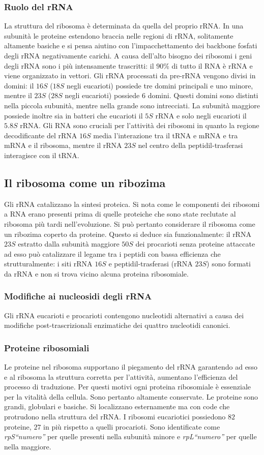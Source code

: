 \subsubsection{Ruolo del rRNA}
La struttura del ribosoma \`e determinata da quella del proprio rRNA. In una subunit\`a le proteine estendono braccia nelle regioni di rRNA, solitamente altamente basiche e si pensa aiutino con 
l'impacchettamento dei backbone fosfati degli rRNA negativamente carichi. A causa dell'alto bisogno dei ribosomi i geni degli rRNA sono i pi\`u intensamente trascritti: il $90\%$ di tutto il RNA \`e
rRNA e viene organizzato in vettori. Gli rRNA processati da pre-rRNA vengono divisi in domini: il $16S$ ($18S$ negli eucarioti) possiede tre domini principali e uno minore, mentre il $23S$ ($28S$ negli
eucarioti) possiede $6$ domini. Questi domini sono distinti nella piccola subunit\`a, mentre nella grande sono intrecciati. La subunit\`a maggiore possiede inoltre sia in batteri che eucarioti il 
$5S$ rRNA e solo negli eucarioti il $5.8S$ rRNA. Gli RNA sono cruciali per l'attivit\`a dei ribosomi in quanto la regione decodificante del rRNA $16S$ media l'interazione tra il tRNA e mRNA e tra
mRNA e il ribosoma, mentre il rRNA $23S$ nel centro della peptidil-trasferasi interagisce con il tRNA. 
\subsection{Il ribosoma come un ribozima}
Gli rRNA catalizzano la sintesi proteica. Si nota come le componenti dei ribosomi a RNA erano presenti prima di quelle proteiche che sono state reclutate al ribosoma pi\`u tardi nell'evoluzione. Si
pu\`o pertanto considerare il ribosoma come un ribozima coperto da proteine. Questo si deduce sia funzionalmente: il rRNA $23S$ estratto dalla subunit\`a maggiore $50S$ dei procarioti senza
proteine attaccate ad esso pu\`o catalizzare il legame tra i peptidi con bassa efficienza che strutturalmente: i siti  rRNA $16S$ e peptidil-trasferasi (rRNA $23S$) sono formati da rRNA e non si 
trova vicino alcuna proteina ribosomiale. 
\subsubsection{Modifiche ai nucleosidi degli rRNA}
Gli rRNA eucarioti e procarioti contengono nucleotidi alternativi a causa dei modifiche post-trascrizionali enzimatiche dei quattro nucleotidi canonici.
\subsubsection{Proteine ribosomiali}
Le proteine nel ribosoma supportano il piegamento del rRNA garantendo ad esso e al ribosoma la struttura corretta per l'attivit\`a, aumentano l'efficienza del processo di traduzione. Per questi motivi ogni
proteina ribosomiale \`e essenziale per la vitalit\`a della cellula. Sono pertanto altamente conservate. Le proteine sono grandi, globulari e basiche. Si localizzano esternamente ma con code che
protrudono nella struttura del rRNA. I ribosomi eucariotici possiedono $82$ proteine, $27$ in pi\`u rispetto a quelli procarioti. Sono identificate come \emph{rpS``numero''} per quelle presenti 
nella subunit\`a minore e \emph{rpL``numero''} per quelle nella maggiore. 
